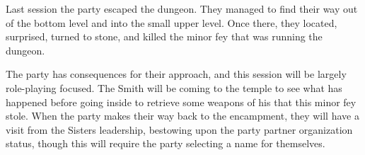 Last session the party escaped the dungeon.
They managed to find their way out of the bottom level and into the small upper level.
Once there, they located, surprised, turned to stone, and killed the minor fey that was running the dungeon.

The party has consequences for their approach, and this session will be largely role-playing focused.
The Smith will be coming to the temple to see what has happened before going inside to retrieve some weapons of his that this minor fey stole.
When the party makes their way back to the encampment, they will have a visit from the Sisters leadership, bestowing upon the party partner organization status, though this will require the party selecting a name for themselves.
